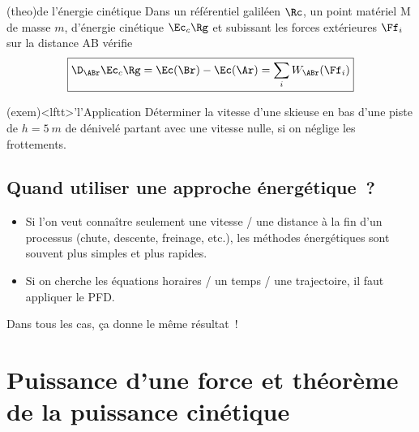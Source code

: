\documentclass[../../main/main.tex]{subfiles}
\begin{document}
\begin{tcb*}(theo){de l'énergie cinétique}
	Dans un référentiel galiléen $\Rc$, un point matériel M de masse $m$,
	d'énergie cinétique $\Ec_c\Rg$ et subissant les forces extérieures $\Ff_i$
	sur la distance AB vérifie
	\[\boxed{\D_{\ABr}\Ec_c\Rg = \Ec(\Br) - \Ec(\Ar) = \sum_i W_{\ABr}(\Ff_i)}\]
\end{tcb*}

\begin{tcb*}(exem)<lftt>'l'{Application}
	Déterminer la vitesse d'une skieuse en bas d'une piste de $h = \SI{5}{m}$ de
	dénivelé partant avec une vitesse nulle, si on néglige les frottements.
	\tcblower
	\vspace*{-20pt}
\end{tcb*}

\subsection{Quand utiliser une approche énergétique~?}

\begin{itemize}
	\item Si l’on veut connaître seulement une vitesse / une distance à la fin
	      d’un processus (chute, descente, freinage, etc.), les méthodes
	      énergétiques sont souvent plus simples et plus rapides.

	\item Si on cherche les équations horaires / un temps / une trajectoire, il
	      faut appliquer le PFD.
\end{itemize}

Dans tous les cas, ça donne le même résultat~!

\section{Puissance d'une force et théorème de la puissance cinétique}
\end{document}
